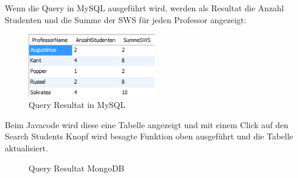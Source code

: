 Wenn die Query in MySQL ausgeführt wird, werden als Resultat die Anzahl Studenten und die Summe der SWS für jeden Professor angezeigt:

\begin{figure}[h] 
	\centering
	\includegraphics[width=0.5\textwidth]{./pictures/Query_MySQL_result.png}
	\caption{Query Resultat in MySQL}
	\label{fig:mysqlres}
\end{figure}

\newpage
Beim Javacode wird diese eine Tabelle angezeigt und mit einem Click auf den
Search Students Knopf wird besagte Funktion oben ausgeführt und die Tabelle
aktualisiert.
\begin{figure}[h]
	\centering
	\caption{Query Resultat MongoDB}
	\label{fig:monogdbres}
\end{figure}
